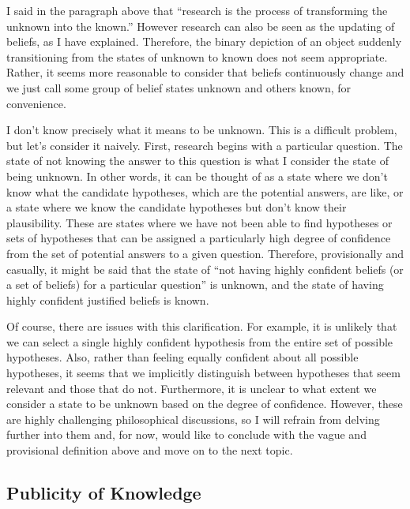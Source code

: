 \documentclass{book}
\begin{document}
I said in the paragraph above that ``research is the process of transforming the unknown into the known.'' However research can also be seen as the updating of beliefs, as I have explained. Therefore, the binary depiction of an object suddenly transitioning from the states of unknown to known does not seem appropriate. Rather, it seems more reasonable to consider that beliefs continuously change and we just call some group of belief states unknown and others known, for convenience.

I don't know precisely what it means to be unknown. This is a difficult problem, but let's consider it naively. First, research begins with a particular question. The state of not knowing the answer to this question is what I consider the state of being unknown. In other words, it can be thought of as a state where we don't know what the candidate hypotheses, which are the potential answers, are like, or a state where we know the candidate hypotheses but don't know their plausibility. These are states where we have not been able to find hypotheses or sets of hypotheses that can be assigned a particularly high degree of confidence from the set of potential answers to a given question. Therefore, provisionally and casually, it might be said that the state of ``not having highly confident beliefs (or a set of beliefs) for a particular question'' is unknown, and the state of having highly confident justified beliefs is known.

Of course, there are issues with this clarification. For example, it is unlikely that we can select a single highly confident hypothesis from the entire set of possible hypotheses. Also, rather than feeling equally confident about all possible hypotheses, it seems that we implicitly distinguish between hypotheses that seem relevant and those that do not. Furthermore, it is unclear to what extent we consider a state to be unknown based on the degree of confidence. However, these are highly challenging philosophical discussions, so I will refrain from delving further into them and, for now, would like to conclude with the vague and provisional definition above and move on to the next topic.

\subsection{Publicity of Knowledge}
\end{document}
